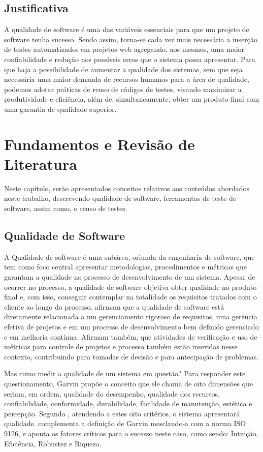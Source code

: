 \documentclass[tg]{mdtufsm}
\begin{document}
\section{Justificativa}

A qualidade de software  é uma das variáveis essenciais para que um projeto de software tenha sucesso.
Sendo assim, torna-se cada vez mais necessária a inserção de testes automatizados em projetos web agregando, aos mesmos, uma maior confiabilidade e redução nos possíveis erros que o sistema possa
apresentar. Para que haja a possibilidade de aumentar a qualidade dos sistemas, sem que seja necessária uma maior
demanda de recursos humanos para a área de qualidade, podemos adotar práticas de reuso de códigos de testes, visando
maximizar a produtividade e eficiência, além de, simultaneamente, obter um produto final com uma garantia de qualidade
superior.

\chapter{Fundamentos e Revisão de Literatura}

Neste capítulo, serão apresentados conceitos relativos aos conteúdos abordados neste trabalho, descrevendo qualidade de software, ferramentas de teste de software, assim como, o reuso de testes.

\section{Qualidade de Software}

A Qualidade de software é uma subárea, oriunda da engenharia de software, que tem como foco central apresentar metodologias,
procedimentos e métricas que garantam a qualidade no processo de desenvolvimento de um sistema. Apesar de ocorrer no processo, a qualidade de software
objetiva obter qualidade no produto final e, com isso, conseguir contemplar na totalidade os requisitos tratados com o cliente ao longo do processo.
\citeauthor{de2006introduccao} \cite{de2006introduccao} afirmam que a qualidade de software está diretamente relacionada a um gerenciamento
rigoroso de requisitos, uma gerência efetiva de projetos e em um processo de desenvolvimento bem definido gerenciado e em melhoria contínua. Afirmam também,
que atividades de verificação e uso de métricas para controle de projetos e processo também estão inseridas nesse contexto, contribuindo para tomadas de
decisão e para antecipação de problemas.

Mas como medir a qualidade de um sistema em questão? Para responder este questionamento, Garvin \cite{garvin1987competing} propõe o conceito que ele chama de
oito dimensões que seriam, em ordem, qualidade do desempenho, qualidade dos recursos, confiabilidade, conformidade, durabilidade, facilidade de manutenção,
estética e percepção. Segundo \citeauthor{garvin1987competing}, atendendo a estes oito critérios, o sistema apresentará qualidade.
\citeauthor{pressman2011engenharia} \cite{pressman2011engenharia} complementa a definição de Garvin mesclando-a com a norma ISO 9126, e aponta os fatores
críticos para o sucesso neste caso, como sendo: Intuição, Eficiência, Robustez e Riqueza.
\end{document}
